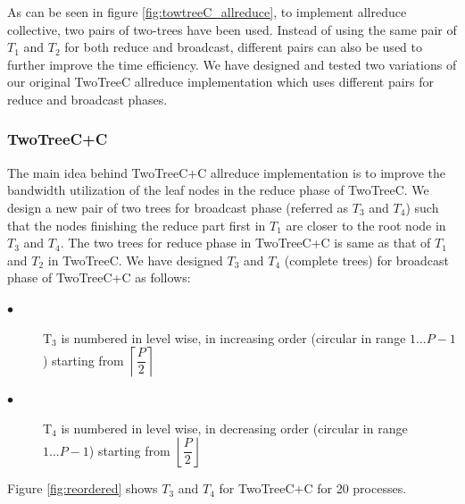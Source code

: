 \documentclass[sigplan,review,anonymous]{acmart}\settopmatter{printfolios=true,printccs=false,printacmref=false}
\begin{document}
As can be seen in figure \ref{fig:towtreeC_allreduce}, to implement allreduce collective, two pairs of two-trees have been used. Instead of using the same pair of $T_1$ and $T_2$ for both reduce and broadcast, different pairs can also be used to further improve the time efficiency. We have designed and tested two variations of our original TwoTreeC allreduce implementation which uses different pairs for reduce and broadcast phases. 


\subsubsection{TwoTreeC+C}
The main idea behind TwoTreeC+C allreduce implementation is to improve the bandwidth utilization of the leaf nodes in the reduce phase of TwoTreeC. We design a new pair of two trees for broadcast phase (referred as $T_3$ and $T_4$) such that the nodes finishing the reduce part first in $T_1$ are closer to the root node in $T_3$ and $T_4$. The two trees for reduce phase in TwoTreeC+C is same as that of $T_1$ and $T_2$ in TwoTreeC. We have designed $T_3$ and $T_4$ (complete trees) for broadcast phase of TwoTreeC+C as follows:

\begin{description}
     \item[$\bullet$]T$_{3}$ is numbered in level wise, in increasing order (circular in range $1...P-1$) starting from $\left \lceil{\dfrac{P}{2}}\right \rceil$
     \item[$\bullet$] T$_{4}$ is numbered in level wise, in decreasing order (circular in range $1...P-1$) starting from $\left \lfloor{\dfrac{P}{2}}\right\rfloor $
 \end{description}
Figure \ref{fig:reordered} shows $T_3$ and $T_4$ for TwoTreeC+C for 20 processes.
\end{document}
